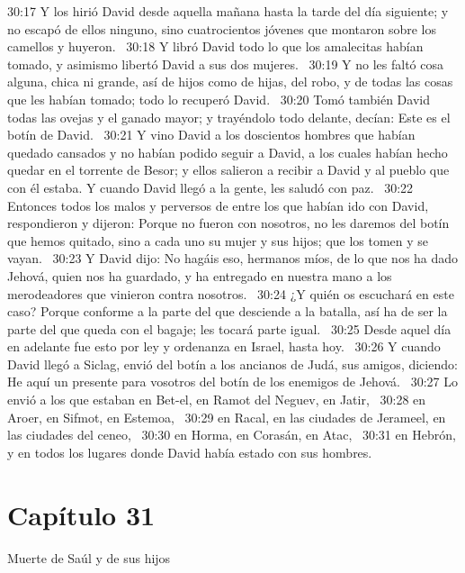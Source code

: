 30:17 Y los hirió David desde aquella mañana hasta la tarde del día siguiente; y no escapó de ellos ninguno, sino cuatrocientos jóvenes que montaron sobre los camellos y huyeron.  
30:18 Y libró David todo lo que los amalecitas habían tomado, y asimismo libertó David a sus dos mujeres.  
30:19 Y no les faltó cosa alguna, chica ni grande, así de hijos como de hijas, del robo, y de todas las cosas que les habían tomado; todo lo recuperó David.  
30:20 Tomó también David todas las ovejas y el ganado mayor; y trayéndolo todo delante, decían: Este es el botín de David.  
30:21 Y vino David a los doscientos hombres que habían quedado cansados y no habían podido seguir a David, a los cuales habían hecho quedar en el torrente de Besor; y ellos salieron a recibir a David y al pueblo que con él estaba. Y cuando David llegó a la gente, les saludó con paz.  
30:22 Entonces todos los malos y perversos de entre los que habían ido con David, respondieron y dijeron: Porque no fueron con nosotros, no les daremos del botín que hemos quitado, sino a cada uno su mujer y sus hijos; que los tomen y se vayan.  
30:23 Y David dijo: No hagáis eso, hermanos míos, de lo que nos ha dado Jehová, quien nos ha guardado, y ha entregado en nuestra mano a los merodeadores que vinieron contra nosotros.  
30:24 ¿Y quién os escuchará en este caso? Porque conforme a la parte del que desciende a la batalla, así ha de ser la parte del que queda con el bagaje; les tocará parte igual.  
30:25 Desde aquel día en adelante fue esto por ley y ordenanza en Israel, hasta hoy.  
30:26 Y cuando David llegó a Siclag, envió del botín a los ancianos de Judá, sus amigos, diciendo: He aquí un presente para vosotros del botín de los enemigos de Jehová.  
30:27 Lo envió a los que estaban en Bet-el, en Ramot del Neguev, en Jatir,  
30:28 en Aroer, en Sifmot, en Estemoa,  
30:29 en Racal, en las ciudades de Jerameel, en las ciudades del ceneo,  
30:30 en Horma, en Corasán, en Atac,  
30:31 en Hebrón, y en todos los lugares donde David había estado con sus hombres.  
\section*{Capítulo 31 }
Muerte de Saúl y de sus hijos   

